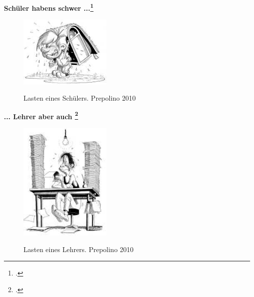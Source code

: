 
\begin{center}
	\textbf{Schüler haben\grq s schwer ...\footcite{prepolino2010}}
\end{center}

\begin{figure}[h]
	\centering
		\includegraphics[width=0.4\textwidth]{images/Lasten-eines-Schuelers.jpg}\\
	\caption{Lasten eines Schülers. Prepolino 2010}
	\label{fig:Lasten-eines-Schuelers}
\end{figure}

\begin{center}
	\textbf{... Lehrer aber auch \footcite{prepolino2010}}
\end{center}

\begin{figure}[h]
	\centering
		\includegraphics[width=0.4\textwidth]{images/Lasten-eines-Lehrers.jpg}\\
	\caption{Lasten eines Lehrers. Prepolino 2010}
	\label{fig:Lasten-eines-Lehrers}
\end{figure}





